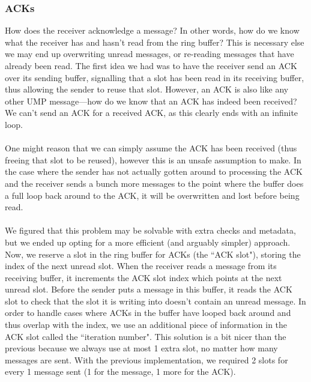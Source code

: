 \subsubsection{ACKs}
How does the receiver acknowledge a message? In other words, how do we know what the receiver has and hasn't read from the ring buffer? This is necessary else we may end up overwriting unread messages, or re-reading messages that have already been read. The first idea we had was to have the receiver send an ACK over its sending buffer, signalling that a slot has been read in its receiving buffer, thus allowing the sender to reuse that slot. However, an ACK is also like any other UMP message---how do we know that an ACK has indeed been received? We can't send an ACK for a received ACK, as this clearly ends with an infinite loop. 
\\\\
One might reason that we can simply assume the ACK has been received (thus freeing that slot to be reused), however this is an unsafe assumption to make. In the case where the sender has not actually gotten around to processing the ACK and the receiver sends a bunch more messages to the point where the buffer does a full loop back around to the ACK, it will be overwritten and lost before being read.
\\\\
We figured that this problem may be solvable with extra checks and metadata, but we ended up opting for a more efficient (and arguably simpler) approach. Now, we reserve a slot in the ring buffer for ACKs (the ``ACK slot"), storing the index of the next unread slot. When the receiver reads a message from its receiving buffer, it increments the ACK slot index which points at the next unread slot. Before the sender puts a message in this buffer, it reads the ACK slot to check that the slot it is writing into doesn't contain an unread message. In order to handle cases where ACKs in the buffer have looped back around and thus overlap with the index, we use an additional piece of information in the ACK slot called the ``iteration number". This solution is a bit nicer than the previous because we always use at most 1 extra slot, no matter how many messages are sent. With the previous implementation, we required 2 slots for every 1 message sent (1 for the message, 1 more for the ACK).

